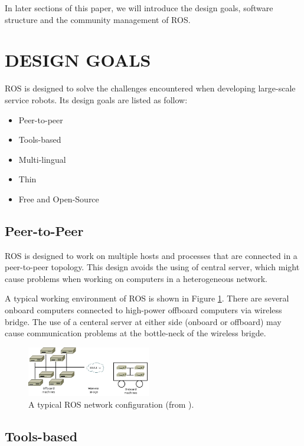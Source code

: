\documentclass[a4paper, 10pt, conference]{ieeeconf}       %
\begin{document}
In later sections of this paper, we will introduce the design goals, software structure and the community management of ROS. 

\section{DESIGN GOALS}

ROS is designed to solve the challenges encountered when developing large-scale service robots\cite{quigley_ros:_2009}. Its design goals are listed as follow:
\begin{itemize}
  \item Peer-to-peer
  \item Tools-based
  \item Multi-lingual
  \item Thin
  \item Free and Open-Source
\end{itemize}

\subsection{Peer-to-Peer}

ROS is designed to work on multiple hosts and processes that are connected in a peer-to-peer topology. This design avoids the using of central server, which might cause problems when working on computers in a heterogeneous network.

A typical working environment of ROS is shown in Figure \ref{fig:network}. There are several onboard computers connected to high-power offboard computers via wireless bridge. The use of a centeral server at either side (onboard or offboard) may cause communication problems at the bottle-neck of the wireless brigde.

\begin{figure}[htpb]
  \centering
  \includegraphics[width=0.48\textwidth]{network}
  \caption{A typical ROS network configuration (from \cite{quigley_ros:_2009}).}
  \label{fig:network}
\end{figure}

\subsection{Tools-based} 
\end{document}
